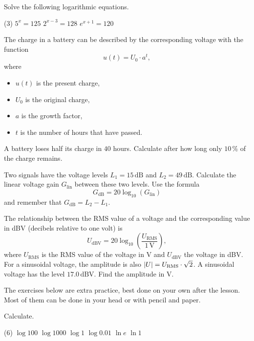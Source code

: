 Solve the following logarithmic equations.
\begin{delar}(3)
  \task $5^x = 125$
  \task $2^{x-3} = 128$
  \task $e^{x+1} = 120$
\end{delar}

The charge in a battery can be described by the corresponding voltage with the function
\[
  u(t) = U_0 \cdot a^t,
\]
where
\begin{itemize}
  \item $u(t)$ is the present charge,
  \item $U_0$ is the original charge,
  \item $a$ is the growth factor,
  \item $t$ is the number of hours that have passed.
\end{itemize}
A battery loses half its charge in $40$ hours. Calculate after how long only $10\,\%$ of the
charge remains.

Two signals have the voltage levels $L_1 = 15\,\text{dB}$ and $L_2 = 49\,\text{dB}$. Calculate the
linear voltage gain $G_{\text{lin}}$ between these two levels. Use the formula
\[
  G_{\text{dB}} = 20\log_{10}(G_{\text{lin}})
\]
and remember that $G_{\text{dB}} = L_2 - L_1$.

The relationship between the RMS value of a voltage and the corresponding value in dBV (decibels
relative to one volt) is
\[
  U_{\text{dBV}} = 20\log_{10}\left(\frac{U_{\text{RMS}}}{1\,\text{V}}\right),
\]
where $U_{\text{RMS}}$ is the RMS value of the voltage in V and $U_{\text{dBV}}$ the voltage in
dBV. For a sinusoidal voltage, the amplitude is also $\lvert U\rvert = U_{\text{RMS}} \cdot \sqrt{2}$.
A sinusoidal voltage has the level $17.0\,\text{dBV}$. Find the amplitude in V.

The exercises below are extra practice, best done on your own after the lesson. Most of them can
be done in your head or with pencil and paper.

Calculate.
\begin{delar}(6)
  \task $\log 100$
  \task $\log 1000$
  \task $\log 1$
  \task $\log 0.01$
  \task $\ln e$
  \task $\ln 1$
\end{delar}

